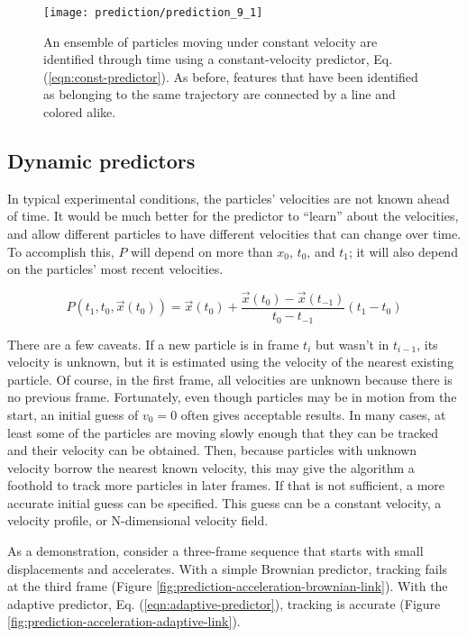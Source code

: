    \begin{figure}
    \centering
    \texttt{[image: prediction/prediction\_9\_1]}
    \caption{\label{fig:prediction-const-const-link}An ensemble of particles moving under constant velocity are identified through time using a constant-velocity predictor, Eq. (\ref{eqn:const-predictor}). As before, features that have been identified as belonging to the same trajectory are connected by a line and colored alike. }
    \end{figure}

\subsection{Dynamic predictors}\label{dynamic-predictors}

In typical experimental conditions, the particles' velocities are not known ahead of time. It would be much better for the predictor to ``learn'' about
the velocities, and allow different particles to have different
velocities that can change over time. To accomplish this, $P$ will depend on more than $x_0$, $t_0$, and $t_1$; it will also depend on the particles' most recent velocities.

\begin{equation}
\label{eqn:adaptive-predictor}
P(t_1, t_0, \vec x(t_0)) = \vec x(t_0) + \frac{\vec x(t_0) - \vec x(t_{-1})}{t_0 - t_{-1}} (t_1 - t_0)
\end{equation}

There are a few caveats.
  If a new particle is in frame $t_i$ but wasn't in $t_{i-1}$, its velocity is unknown, but it is estimated using the velocity of the nearest existing particle. Of course, in the first frame, all
  velocities are unknown because
  there is no previous frame. Fortunately, even though particles may be in motion from the start, an initial guess
  of $v_0 = 0$ often gives acceptable results. In many cases, at
  least some of the particles are moving slowly enough that they can be
  tracked and their velocity can be obtained. Then, because particles with
  unknown velocity borrow the nearest known velocity, this may give the algorithm a foothold to track more particles
  in later frames. If that is not sufficient, a more accurate initial guess can be specified. This guess can be a constant velocity, a velocity profile, or N-dimensional velocity field.

As a demonstration, consider a three-frame sequence that starts
with small displacements and accelerates. With a simple Brownian predictor, tracking fails at the third frame (Figure \ref{fig:prediction-acceleration-brownian-link}). With the adaptive predictor, Eq. (\ref{eqn:adaptive-predictor}), tracking is accurate (Figure \ref{fig:prediction-acceleration-adaptive-link}).


